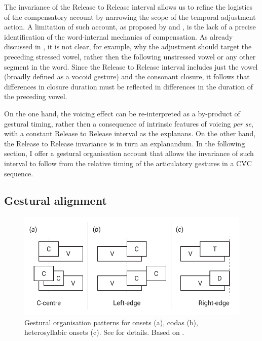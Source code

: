 \documentclass[preprint]{JASAnew}
\begin{document}
The invariance of the Release to Release interval allows us to refine
the logistics of the compensatory account by narrowing the scope of the
temporal adjustment action. A limitation of such account, as proposed by
\citet{slis1969} and \citet{lehiste1970}, is the lack of a precise
identification of the word-internal mechanics of compensation. As
already discussed in , it is not clear, for example, why
the adjustment should target the preceding stressed vowel, rather then
the following unstressed vowel or any other segment in the word. Since
the Release to Release interval includes just the vowel (broadly defined
as a vocoid gesture) and the consonant closure, it follows that
differences in closure duration must be reflected in differences in the
duration of the preceding vowel.

On the one hand, the voicing effect can be re-interpreted as a
by-product of gestural timing, rather then a consequence of intrinsic
features of voicing \emph{per se}, with a constant Release to Release
interval as the explanans. On the other hand, the Release to Release
invariance is in turn an explanandum. In the following section, I offer
a gestural organisation account that allows the invariance of such
interval to follow from the relative timing of the articulatory gestures
in a CV́C sequence.

\hypertarget{gestural-alignment}{%
\subsection{Gestural alignment}\label{gestural-alignment}}

\label{s:gestural}

\begin{figure}
  \centering
  \includegraphics[width=\linewidth]{img/gorganisation.pdf}
  \caption{Gestural organisation patterns for onsets (a), codas (b), heterosyllabic onsets (c). See  for details. Based on \citet{marin2010}.}
  \label{f:gorganisation}
\end{figure}
\end{document}
